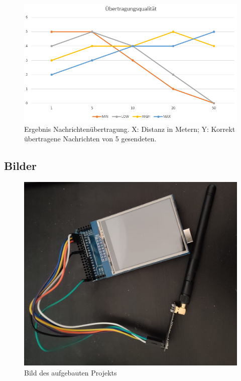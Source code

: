 \documentclass[a4paper, 11pt]{scrartcl}
\begin{document}
\begin{small}
\begin{figure}[H]
    \begin{center}
        \includegraphics[scale=0.75]{Bilder/testfall.png}
        \caption{Ergebnis Nachrichtenübertragung. X: Distanz in Metern; Y: Korrekt übertragene Nachrichten von 5 gesendeten.}\label{diag:qualitytest}
    \end{center}
\end{figure}


\subsection{Bilder}\label{ch:pics}
\begin{figure}[H]
    \begin{center}
        \includegraphics[scale=0.15]{Bilder/projekt_fertig.jpeg}
        \caption{Bild des aufgebauten Projekts}\label{pic:project_done}
    \end{center}
\end{figure}


\end{small}
\end{document}
